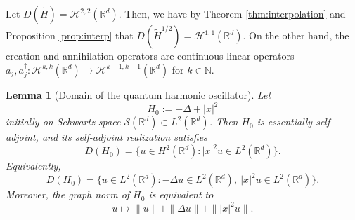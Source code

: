 \documentclass[11pt]{amsart}
\newcommand{\1}{\mathbbm{1}}
\theoremstyle{plain}
\newtheorem{lemma}[theorem]{Lemma}
\theoremstyle{definition}
\theoremstyle{remark}
\numberwithin{equation}{section}
\begin{document}
Let $D(\tilde H) = \mathcal H^{2,2}(\mathbb R^d).$ Then, we have by Theorem \ref{thm:interpolation} and Proposition \ref{prop:interp} that $D(\tilde H^{1/2}) = \mathcal H^{1,1}(\mathbb R^d).$ On the other hand, the creation and annihilation operators are continuous linear operators $a_j,a_j^{\dagger}:\mathcal H^{k,k}(\mathbb R^d) \to  \mathcal H^{k-1,k-1}(\mathbb R^d)$ for $k \in \mathbb N.$






\begin{lemma}[Domain of the quantum harmonic oscillator]
Let
\[
H_0:=-\Delta+|x|^2
\]
initially on Schwartz space \(\mathcal S(\mathbb R^d)\subset L^2(\mathbb R^d)\). Then \(H_0\)
is essentially self-adjoint, and its self-adjoint realization satisfies
\[
D(H_0)
=
\{u\in H^2(\mathbb R^d): |x|^2u\in L^2(\mathbb R^d)\}.
\]
Equivalently,
\[
D(H_0)
=
\{u\in L^2(\mathbb R^d): -\Delta u\in L^2(\mathbb R^d),\ |x|^2u\in L^2(\mathbb R^d)\}.
\]
Moreover, the graph norm of \(H_0\) is equivalent to
\[
u\mapsto \|u\|+\|\Delta u\|+\||x|^2u\|.
\]
\end{lemma}
\end{document}
